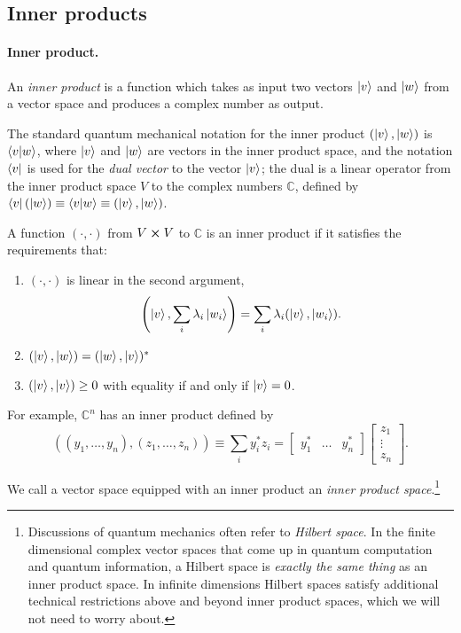 \documentclass{article}
\begin{document}
\subsection{Inner products}

\paragraph{Inner product.} An \emph{inner product} is a function which takes as input two vectors $\ket{v}$ and $\ket{w}$ from a vector space and produces a complex number as output.

The standard quantum mechanical notation for the inner product $(\ket{v}, \ket{w})$ is $\braket{v}{w}$, where $\ket{v}$ and $\ket{w}$ are vectors in the inner product space, and the notation $\bra{v}$ is used for the \emph{dual vector} to the vector $\ket{v}$; the dual is a linear operator from the inner product space $V$ to the complex numbers $\mathbb{C}$, defined by $\bra{v}(\ket{w}) \equiv \braket{v}{w} \equiv (\ket{v}, \ket{w})$.

A function $(\cdot, \cdot)$ from $V \cross V$ to $\mathbb{C}$ is an inner product if it satisfies the requirements that: \begin{enumerate}
  \item $(\cdot, \cdot)$ is linear in the second argument, \begin{equation}
      \left(\ket{v}, \sum_i \lambda_i\ket{w_i}\right) = \sum_i \lambda_i(\ket{v}, \ket{w_i}).
    \end{equation}
  \item $(\ket{v}, \ket{w}) = (\ket{w}, \ket{v})^*$
  \item $(\ket{v}, \ket{v}) \geq 0$ with equality if and only if $\ket{v} = 0$.
\end{enumerate}

For example, $\mathbb{C}^n$ has an inner product defined by \begin{equation}
  ((y_1, \ldots, y_n), (z_1, \ldots, z_n)) \equiv \sum_i y_i^*z_i =
    \begin{bmatrix}y_1^* & \dots & y_n^*\end{bmatrix}
    \begin{bmatrix}z_1 \\ \vdots \\ z_n\end{bmatrix}.
\end{equation}

We call a vector space equipped with an inner product an \emph{inner product space}.\footnote{Discussions of quantum mechanics often refer to \emph{Hilbert space}. In the finite dimensional complex vector spaces that come up in quantum computation and quantum information, a Hilbert space is \emph{exactly the same thing} as an inner product space. In infinite dimensions Hilbert spaces satisfy additional technical restrictions above and beyond inner product spaces, which we will not need to worry about.}
\end{document}
